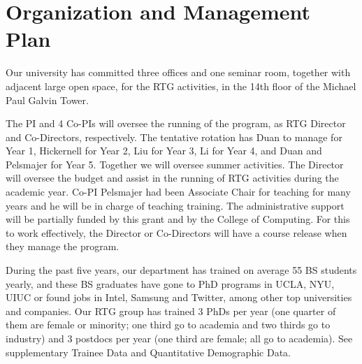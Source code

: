 \documentclass[11pt]{NSFamsart}
\begin{document}
\section{Organization and Management Plan }
 
 \iffalse
 Provide evidence of past success in training undergraduates, graduate students, and postdocs, identifying names, degree dates, and subsequent placement (including the flow of undergraduates into graduate programs). Applicants may refer to Trainee Data in supplemental documents, if included. Describe the plans, procedures, and personnel for the development and monitoring of all aspects of the project. In particular, discuss plans to ensure appropriate mentoring of students and postdoctoral associates, as well as the roles of the faculty involved. Provide evidence of faculty commitment necessary for the implementation of the proposed program. If the project involves international collaborations, industrial internships, or arrangements with government laboratories, businesses, or other departments, then the proposal should document existing arrangements, any plans for expanding these arrangements, and the personnel involved in managing these linkages.  
 \fi
 
Our university has committed three offices and one seminar room, together with adjacent large open space, for the RTG activities, in the 14th floor of the Michael Paul Galvin Tower. 
 
 The PI and 4 Co-PIs will oversee the running of the program, as RTG Director  and Co-Directors, respectively.  The tentative rotation has Duan to manage for Year 1, Hickernell for Year 2,    Liu for  Year 3, Li for Year 4, and Duan and Pelsmajer for Year 5.   Together we will oversee summer activities.  
The Director will oversee the budget and assist in the running of RTG activities during the academic year. Co-PI Pelsmajer had been
Associate Chair for teaching for many years and he will be in charge of teaching training. 
The administrative support will be partially funded by this grant and by the College of Computing. 
For this to work effectively, the Director or Co-Directors will have a course release when they manage the program.

During the past five years, our department has trained on average 55 BS students yearly, and these BS graduates have gone to PhD programs in UCLA, NYU, UIUC or found jobs in Intel, Samsung and Twitter,  among other top universities and companies. Our RTG group has trained 3 PhDs per year (one quarter of them are female or minority; one third go to academia and two thirds go to industry)  and 3 postdocs per year (one third are female; all go to academia).  See supplementary Trainee Data and Quantitative Demographic Data. 
\end{document}
